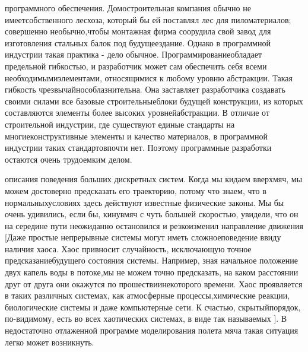 \documentclass[10pt]{article}
\begin{document}
{ программного обеспечения.} Домостроительная компания обычно не имеет\linebreak  собственного лесхоза, который бы ей поставлял лес для пиломатериалов; совершенно необычно,\linebreak  чтобы монтажная фирма соорудила свой завод для изготовления стальных балок под будущее\linebreak здание. Однако в программной индустрии такая практика - дело обычное. Программирование\linebreak обладает предельной гибкостью, и разработчик может сам обеспечить себя всеми необходимыми\linebreak элементами, относящимися к любому уровню абстракции. Такая гибкость чрезвычайно\linebreak соблазнительна. Она заставляет разработчика создавать своими силами все базовые строительные\linebreak блоки будущей конструкции, из которых составляются элементы более высоких уровней\linebreak абстракции. В отличие от строительной индустрии, где существуют единые стандарты на многие\linebreak конструктивные элементы и качество материалов, в программной индустрии таких стандартов\linebreak почти нет. Поэтому программные разработки остаются очень трудоемким делом.\vspace{3mm}
 
{ описания поведения больших дискретных систем.} Когда мы кидаем вверх\linebreak мяч, мы можем достоверно предсказать его траекторию, потому что знаем, что в нормальных\linebreak условиях здесь действуют известные физические законы. Мы бы очень удивились, если бы, кинув\linebreak мяч с чуть большей скоростью, увидели, что он на середине пути неожиданно остановился и резко\linebreak изменил направление движения [Даже простые непрерывные системы могут иметь сложное\linebreak поведение ввиду наличия хаоса. Хаос привносит случайность, исключающую точное предсказание\linebreak будущего состояния системы. Например, зная начальное положение двух капель воды в потоке,\linebreak мы не можем точно предсказать, на каком расстоянии друг от друга они окажутся по прошествии\linebreak некоторого времени. Хаос проявляется в таких различных системах, как атмосферные процессы,\linebreak химические реакции, биологические системы и даже компьютерные сети. К счастью, скрытый\linebreak порядок, по-видимому, есть во всех хаотических системах, в виде так называемых {}]\linebreak. В недостаточно отлаженной программе моделирования полета мяча такая ситуация легко может возникнуть. 
\end{document}
